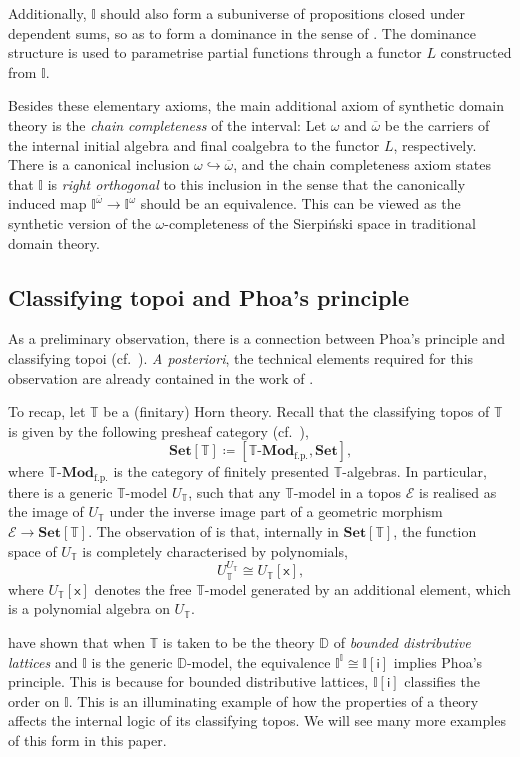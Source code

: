 \documentclass[a4paper,12pt]{amsart}
\theoremstyle{definition}
\newcommand{\mc}[1]{\mathcal{#1}}
\newcommand{\mb}[1]{\mathbf{#1}}
\newcommand{\mbb}[1]{\mathbb{#1}}
\newcommand{\T}{\mbb T}
\newcommand{\I}{\mbb I}
\newcommand{\mr}[1]{\mathrm{#1}}
\newcommand{\ms}[1]{\mathsf{#1}}
\newcommand{\Set}{\mb{Set}}
\newcommand{\ov}[1]{\overline{#1}}
\newcommand{\hook}{\hookrightarrow}
\newcommand{\fp}{_{\mr{f.p.}}}
\newcommand{\mmod}[1]{#1\text{-}\mathbf{Mod}}
\begin{document}
Additionally, $\I$ should also form a subuniverse of propositions closed under dependent sums, so as to form a dominance in the sense of \citet{rosolini1986continuity}. The dominance structure is used to parametrise partial functions through a functor $L$ constructed from $\I$. 

Besides these elementary axioms, the main additional axiom of synthetic domain theory is the \emph{chain completeness} of the interval: Let $\omega$ and $\ov\omega$ be the carriers of the internal initial algebra and final coalgebra to the functor $L$, respectively. 
There is a canonical inclusion $\omega \hook \ov\omega$, and the chain completeness axiom states that $\I$ is \emph{right orthogonal} to this inclusion in the sense that the canonically induced map $\I^{\ov\omega} \to \I^{\omega}$ should be an equivalence. This can be viewed as the synthetic version of the $\omega$-completeness of the Sierpi\'nski space in traditional domain theory.

\subsection{Classifying topoi and Phoa's principle}\label{subsec:classtopphoa}

As a preliminary observation, there is a connection between Phoa's principle and classifying topoi (cf.\ \citet[Lem 3.8]{gratzer2024directed}).
\emph{A posteriori}, the technical elements required for this observation are already contained in the work of \citet{RN879}.

To recap, let $\T$ be a (finitary) Horn theory. Recall that the classifying topos of $\T$ is given by the following presheaf category (cf.\ \citet[D3.1]{johnstone2002sketches}),
\[ \Set[\T] \coloneq [\mmod\T\fp,\Set]\text{,} \]
where $\mmod\T\fp$ is the category of finitely presented $\T$-algebras. In particular, there is a generic $\T$-model $U_\T$, such that any $\T$-model in a topos $\mc E$ is realised as the image of $U_\T$ under the inverse image part of a geometric morphism $\mc E \to \Set[\T]$. The observation of \citet{RN879} is that, internally in $\Set[\T]$, the function space of $U_\T$ is completely characterised by polynomials,
\[ U_\T^{U_\T} \cong U_\T[\ms{x}]\text{,} \]
where $U_\T[\ms{x}]$ denotes the free $\T$-model generated by an additional element, which is a  polynomial algebra on $U_\T$.

\citet{gratzer2024directed} have shown that when $\T$ is taken to be the theory $\mbb D$ of \emph{bounded distributive lattices} and $\I$ is the generic $\mbb D$-model, the equivalence $\I^\I \cong \I[\ms{i}]$ implies Phoa's principle. This is because for bounded distributive lattices, $\I[\ms{i}]$ classifies the order on $\I$. This is an illuminating example of how the properties of a theory affects the internal logic of its classifying topos. We will see many more examples of this form in this paper.
\end{document}
